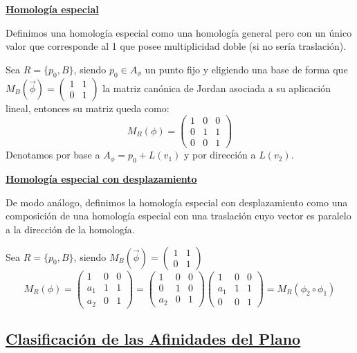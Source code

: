 \documentclass[10pt,a4paper,openright]{book}
\begin{document}
\underline{\textbf{Homología especial}}

Definimos una homología especial como una homología general pero con un único valor que corresponde al 1 que posee multiplicidad doble (si no sería traslación).

Sea $R = \{p_0 , B\}$, siendo $p_0 \in A_\phi$ un punto fijo y eligiendo una base de forma que $M_B (\vec{\phi}) = \begin{pmatrix} 1 & 1   \\ 0 & 1  \end{pmatrix} $ la matriz canónica de Jordan asociada a su aplicación lineal, entonces su matriz queda como:
$$M_R (\phi) = \left(\begin{array}{c|cc}
1  & 0 & 0 \\
\hline
0 & 1 &  1 \\
0 & 0 &  1
\end{array}
\right)$$
Denotamos por base a $A_\phi = p_0 + L(v_1)$ y por dirección a $L(v_2)$.

\underline{\textbf{Homología especial con desplazamiento}}

De modo análogo, definimos la homología especial con desplazamiento como una composición de una homología especial con una traslación cuyo vector es paralelo a la dirección de la homología.

Sea $R = \{p_0 , B\}$, siendo $M_B (\vec{\phi}) = \begin{pmatrix} 1 & 1   \\ 0 & 1  \end{pmatrix} $
$$M_R (\phi) = \left(\begin{array}{c|cc}
1  & 0 & 0 \\
\hline
a_1 & 1 &  1 \\
a_2 & 0 &  1
\end{array}
\right) = \left(\begin{array}{c|cc}
1  & 0 & 0 \\
\hline
0 & 1 &  0 \\
a_2 & 0 &  1
\end{array}
\right)\left(\begin{array}{c|cc}
1  & 0 & 0 \\
\hline
a_1 & 1 &  1 \\
0 & 0 &  1
\end{array}
\right) = M_R (\phi_2 \circ \phi_1)$$

\newpage
\subsection*{\underline{Clasificación de las Afinidades del Plano}}
\end{document}
